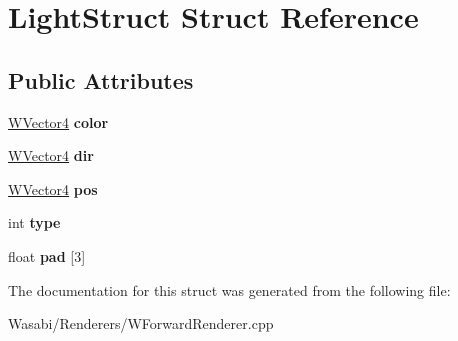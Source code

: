 \hypertarget{struct_light_struct}{}\section{Light\+Struct Struct Reference}
\label{struct_light_struct}
\subsection*{Public Attributes}
\begin{DoxyCompactItemize}
\item 
\hyperlink{class_w_vector4}{W\+Vector4} {\bfseries color}\hypertarget{struct_light_struct_a597e2bb30e3d7d2af0ce6d80468fc7c1}{}\label{struct_light_struct_a597e2bb30e3d7d2af0ce6d80468fc7c1}

\item 
\hyperlink{class_w_vector4}{W\+Vector4} {\bfseries dir}\hypertarget{struct_light_struct_a4ff553bc036087d0e2618516de2b039c}{}\label{struct_light_struct_a4ff553bc036087d0e2618516de2b039c}

\item 
\hyperlink{class_w_vector4}{W\+Vector4} {\bfseries pos}\hypertarget{struct_light_struct_a225084cf7f9e12887745f2bb1c8329e6}{}\label{struct_light_struct_a225084cf7f9e12887745f2bb1c8329e6}

\item 
int {\bfseries type}\hypertarget{struct_light_struct_a5b0efdd68d6ef9ef092f5d738e85ea9a}{}\label{struct_light_struct_a5b0efdd68d6ef9ef092f5d738e85ea9a}

\item 
float {\bfseries pad} \mbox{[}3\mbox{]}\hypertarget{struct_light_struct_ac2b200d24b5652dd0079e252b264177c}{}\label{struct_light_struct_ac2b200d24b5652dd0079e252b264177c}

\end{DoxyCompactItemize}


The documentation for this struct was generated from the following file\+:\begin{DoxyCompactItemize}
\item 
Wasabi/\+Renderers/W\+Forward\+Renderer.\+cpp\end{DoxyCompactItemize}
